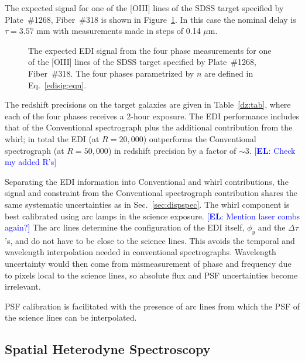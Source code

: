 \documentclass[preprint2, 10pt]{aastex}
\newcommand{\eric}[1]{\textcolor{blue}{[{\bf EL}: #1]}}
\begin{document}
The expected signal for one of the [OIII] lines of the SDSS target specified by Plate~\#1268, Fiber~\#318 is shown
in Figure~\ref{edicounts:fig}.   In this case the nominal delay is $\tau = 3.57$ mm with measurements
made in steps of 0.14 $\mu$m.


\begin{figure}[t]
   \centering
   \caption{The expected EDI signal from the four phase measurements for one of the [OIII] lines of
   the SDSS target specified by Plate~\#1268, Fiber~\#318. The four phases parametrized by $n$ are defined in Eq.~\ref{edisig:eqn}.
\label{edicounts:fig}}
\end{figure}


The redshift precisions on the target galaxies are given in Table~\ref{dz:tab}, where each of the four phases receives
a 2-hour exposure.  The EDI performance includes that of the Conventional spectrograph plus
the additional contribution from the whirl; in total the EDI (at $R=20,000$) outperforms the Conventional spectrograph (at $R=50,000$) 
in redshift precision by a factor of $\sim 3$. 
\eric{Check my added R's} 

Separating the EDI information into Conventional and whirl contributions,
the signal and constraint from the Conventional spectrograph contribution shares the same systematic uncertainties as in Sec.~\ref{sec:dispspec}. 
The whirl component is best calibrated using arc lamps in the science exposure.  
\eric{Mention laser combs again?} 
The arc lines determine the configuration
of the EDI itself, $\phi_y$ and the $\Delta \tau$'s, and do not have to be close
to the science lines.  This avoids the temporal and wavelength interpolation needed in conventional spectrographs.
Wavelength uncertainty would then come from mismeasurement of phase and frequency due to pixels local to the
science lines, so absolute flux and PSF uncertainties become irrelevant. 

PSF calibration is facilitated with the presence of arc lines from which the
PSF  of the science lines can be interpolated.


\subsection{Spatial Heterodyne Spectroscopy}
\label{SHS:sec} 
\end{document}
